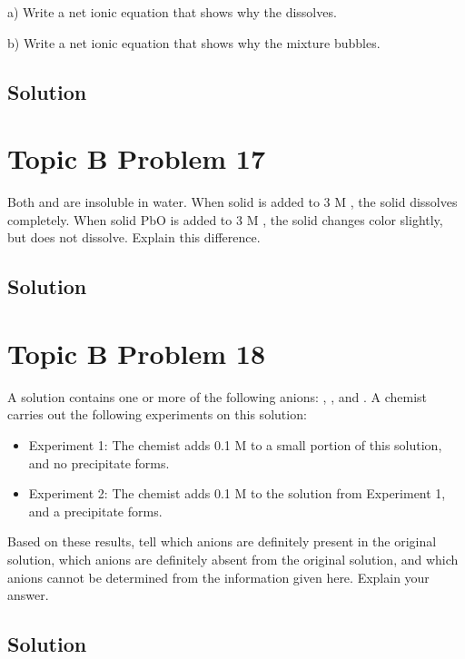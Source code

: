 \documentclass[10pt]{article}
\begin{document}
        a) Write a net ionic equation that shows why the  dissolves.
        
        b) Write a net ionic equation that shows why the mixture bubbles.

        \subsection{Solution}

    \pagebreak
    \section{Topic B Problem 17}
        Both  and  are insoluble in water. When solid  is added to 3 M , the solid dissolves completely. 
        When solid PbO is added to 3 M , the solid changes color slightly, but does not dissolve. 
        Explain this difference.

        \subsection{Solution}

    \pagebreak
    \section{Topic B Problem 18}
        A solution contains one or more of the following anions: , , and . 
        A chemist carries out the following experiments on this solution:
        \begin{itemize}
            \item Experiment 1: The chemist adds 0.1 M  to a small portion of this solution, and no precipitate forms.
            \item Experiment 2: The chemist adds 0.1 M  to the solution from Experiment 1, and a precipitate forms.
        \end{itemize}
        Based on these results, tell which anions are definitely present in the original solution, which anions are definitely absent from the original solution, and which anions cannot be determined from the information given here. 
        Explain your answer.

        \subsection{Solution}
\end{document}
